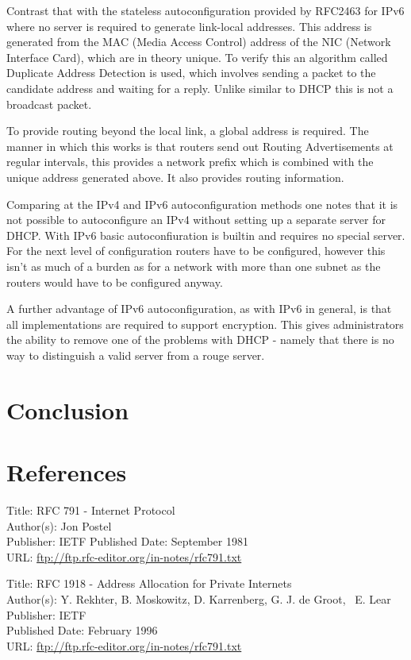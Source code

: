 \documentclass[a4paper,12pt]{article}
\begin{document}
Contrast that with the stateless autoconfiguration provided by RFC2463 for
IPv6 where no server is required to generate link-local addresses. This address
is generated from the MAC (Media Access Control) address of the NIC (Network
Interface Card), which are in theory unique. To verify this an algorithm called
Duplicate Address Detection is used, which involves sending a packet to the
candidate address and waiting for a reply. Unlike similar to DHCP this is not a
broadcast packet.

To provide routing beyond the local link, a global address is required. The
manner in which this works is that routers send out Routing Advertisements at
regular intervals, this provides a network prefix which is combined with the
unique address generated above. It also provides routing information.

Comparing at the IPv4 and IPv6 autoconfiguration methods one notes that it is
not possible to autoconfigure an IPv4 without setting up a separate server for
DHCP. With IPv6 basic autoconfiuration is builtin and requires no special
server. For the next level of configuration routers have to be configured,
however this isn't as much of a burden as for a network with more than one
subnet as the routers would have to be configured anyway.

A further advantage of IPv6 autoconfiguration, as with IPv6 in general, is that
all implementations are required to support encryption. This gives
administrators the ability to remove one of the problems with DHCP - namely
that there is no way to distinguish a valid server from a rouge server.

\section{Conclusion}


\section{References}

Title: RFC 791 - Internet Protocol \\
Author(s): Jon Postel \\
Publisher: IETF
Published Date: September 1981 \\
URL: \url{ftp://ftp.rfc-editor.org/in-notes/rfc791.txt}	 

Title: RFC 1918 - Address Allocation for Private Internets \\
Author(s): Y. Rekhter, B. Moskowitz, D. Karrenberg, G. J. de Groot, \
\indent E. Lear \\
Publisher: IETF \\
Published Date: February 1996  \\
URL: \url{ftp://ftp.rfc-editor.org/in-notes/rfc791.txt}	 
\end{document}
